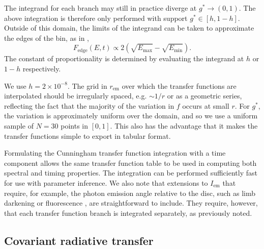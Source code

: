 \documentclass[fleqn,usenatbib]{mnras}
\newcommand{\rhoem}{r_\text{em}}
\begin{document}
The integrand for each branch may still in practice diverge at $g^\ast
\rightarrow (0, 1)$. The above integration is therefore only performed with
support $g^\ast \in [h, 1 - h]$. Outside of this domain, the limits of the
integrand can be taken to approximate the edges of the bin, as in
\cite{dauser_broad_2010},
\begin{equation}
    F_\text{edge}(E,t) \propto 2\left( \sqrt{E_\text{max}} - \sqrt{E_\text{min}} \right).
\end{equation}
The constant of proportionality is determined by evaluating the integrand at $h$
or $1 - h$ respectively.

We use $h = 2 \times 10^{-8}$. The grid in $\rhoem$ over which the transfer
functions are interpolated should be irregularly spaced, e.g.  $\sim 1 / r$ or
as a geometric series, reflecting the fact that the majority of the variation in
$f$ occurs at small $r$. For $g^\ast$, the variation is approximately uniform
over the domain, and so we use a uniform sample of $N = 30$ points in $[0,1]$.
This also has the advantage that it makes the transfer functions simple to
export in tabular format.

Formulating the Cunningham transfer function integration with a time component
allows the same transfer function table to be used in computing both spectral
and timing properties. The integration can be performed sufficiently fast for
use with parameter inference. We also note that extensions to $I_\text{em}$ that
require, for example, the photon emission angle relative to the disc, such as
limb darkening or fluorescence \citep{matt_reflection_1993}, are straightforward
to include. They require, however, that each transfer function branch is
integrated separately, as previously noted.

\subsection{Covariant radiative transfer}
\end{document}
